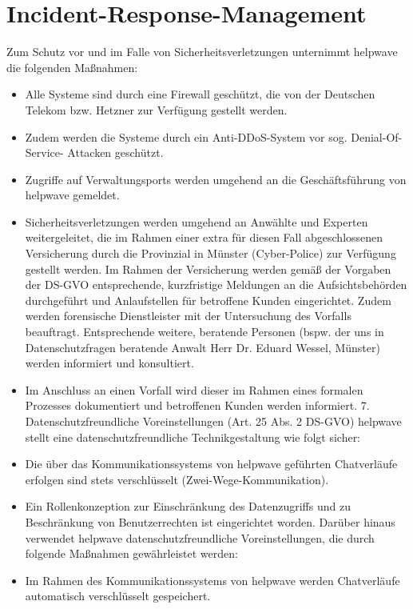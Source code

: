 \documentclass[10pt]{article}
\begin{document}
\section{Incident-Response-Management}
Zum Schutz vor und im Falle von Sicherheitsverletzungen unternimmt helpwave die
folgenden Maßnahmen:
\begin{itemize}
	\item Alle Systeme sind durch eine Firewall geschützt, die von der Deutschen Telekom bzw.
	      Hetzner zur Verfügung gestellt werden.
	\item Zudem werden die Systeme durch ein Anti-DDoS-System vor sog. Denial-Of-Service-
	      Attacken geschützt.
	\item Zugriffe auf Verwaltungsports werden umgehend an die Geschäftsführung von
	      helpwave gemeldet.
	\item Sicherheitsverletzungen werden umgehend an Anwählte und Experten
	      weitergeleitet, die im Rahmen einer extra für diesen Fall abgeschlossenen
	      Versicherung durch die Provinzial in Münster (Cyber-Police) zur Verfügung gestellt
	      werden. Im Rahmen der Versicherung werden gemäß der Vorgaben der DS-GVO
	      entsprechende, kurzfristige Meldungen an die Aufsichtsbehörden durchgeführt und
	      Anlaufstellen für betroffene Kunden eingerichtet. Zudem werden forensische
	      Dienstleister mit der Untersuchung des Vorfalls beauftragt. Entsprechende weitere,
	      beratende Personen (bspw. der uns in Datenschutzfragen beratende Anwalt Herr Dr.
	      Eduard Wessel, Münster) werden informiert und konsultiert.
	\item Im Anschluss an einen Vorfall wird dieser im Rahmen eines formalen Prozesses
	      dokumentiert und betroffenen Kunden werden informiert.
	      7. Datenschutzfreundliche Voreinstellungen (Art. 25 Abs. 2 DS-GVO)
	      helpwave stellt eine datenschutzfreundliche Technikgestaltung wie folgt sicher:
	\item Die über das Kommunikationssystems von helpwave geführten Chatverläufe erfolgen
	      sind stets verschlüsselt (Zwei-Wege-Kommunikation).
	\item Ein Rollenkonzeption zur Einschränkung des Datenzugriffs und zu Beschränkung von
	      Benutzerrechten ist eingerichtet worden.
	      Darüber hinaus verwendet helpwave datenschutzfreundliche Voreinstellungen, die durch
	      folgende Maßnahmen gewährleistet werden:
	\item Im Rahmen des Kommunikationssystems von helpwave werden Chatverläufe
	      automatisch verschlüsselt gespeichert.

\end{itemize}
\end{document}
